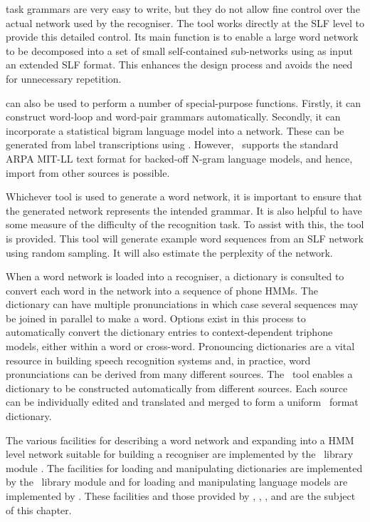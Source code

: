  task grammars are very easy to write, but they 
do not allow fine control
over the actual network used by the recogniser. 
The tool  works directly at the SLF level to provide
this detailed control.  Its main function is to 
enable a large word network to be decomposed into
a set of small self-contained sub-networks using as input an extended
SLF format.  This enhances the
design process and avoids the need for unnecessary repetition.

 can also be used to perform a number
of special-purpose functions.  Firstly, it can construct 
word-loop and word-pair grammars automatically.  Secondly,
it can incorporate a statistical bigram
language model into a network.  These can be generated from label
transcriptions using .  However,
\HTK\ supports the standard ARPA MIT-LL text format for backed-off
N-gram language models, and hence, import from other sources is possible.
 
Whichever tool is used to generate a word network, it is important
to ensure that the generated network represents the intended grammar.
It is also helpful to have some measure of the difficulty of the
recognition task.  To assist with this, the tool  is
provided.  This tool will generate example word sequences from
an SLF network using random sampling.  It will also estimate the
perplexity of the network.

When a word network is loaded into a recogniser, 
a dictionary is consulted to convert each
word in the network into a sequence of phone HMMs.   The dictionary can
have multiple pronunciations in which case several sequences may be joined
in parallel to make a word.  Options exist in this process to automatically
convert the dictionary entries to context-dependent triphone
models, either within a word or cross-word.  Pronouncing 
dictionaries are a vital resource in building speech recognition
systems and, in practice, word pronunciations can be derived from
many different sources.  The \HTK\ tool  enables a dictionary
to be constructed automatically from different sources.  Each source
can be individually edited and translated and merged to form a
uniform \HTK\ format dictionary.

The various facilities for describing a word network and expanding into a
HMM level network suitable for building a recogniser are implemented
by the \HTK\ library module .  The facilities for loading
and manipulating dictionaries are implemented by the \HTK\ library module
 and  for loading
and manipulating language models are implemented by
.  These facilities and those provided by 
, , , 
 and  are
the subject of this chapter.

